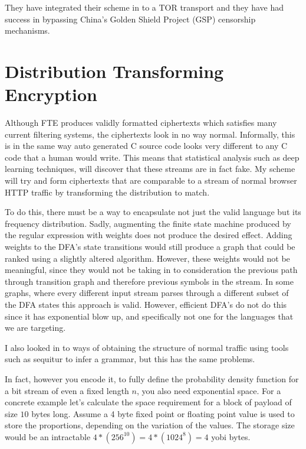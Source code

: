 \documentclass[10pt,a4paper]{article}
\begin{document}
They have integrated their scheme in to a TOR transport and they have had success in bypassing China's Golden Shield Project (GSP) censorship mechanisms.



\pagebreak
\section{Distribution Transforming Encryption}

Although FTE produces validly formatted ciphertexts which satisfies many current filtering systems, the ciphertexts look in no way normal. Informally, this is in the same way auto generated C source code looks very different to any C code that a human would write. This means that statistical analysis such as deep learning techniques, will discover that these streams are in fact fake. My scheme will try and form ciphertexts that are comparable to a stream of normal browser HTTP traffic by transforming the distribution to match. 

To do this, there must be a way to encapsulate not just the valid language but its frequency distribution. Sadly, augmenting the finite state machine produced by the regular expression with weights does not produce the desired effect. Adding weights to the DFA's state transitions would still produce a graph that could be ranked using a slightly altered algorithm. However, these weights would not be meaningful, since they would not be taking in to consideration the previous path through transition graph and therefore previous symbols in the stream. In some graphs, where every different input stream parses through a different subset of the DFA states this approach is valid. However, efficient DFA's do not do this since it has exponential blow up, and specifically not one for the languages that we are targeting.

I also looked in to ways of obtaining the structure of normal traffic using tools such as sequitur\cite{sequitur} to infer a grammar, but this has the same problems. 

In fact, however you encode it, to fully define the probability density function for a bit stream of even a fixed length $n$, you also need exponential space. For a concrete example let's calculate the space requirement for a block of payload of size $10$ bytes long. Assume a 4 byte fixed point or floating point value is used to store the proportions, depending on the variation of the values. The storage size would be an intractable $4*(256^10) = 4*(1024^8) = 4$ yobi bytes.
\end{document}
